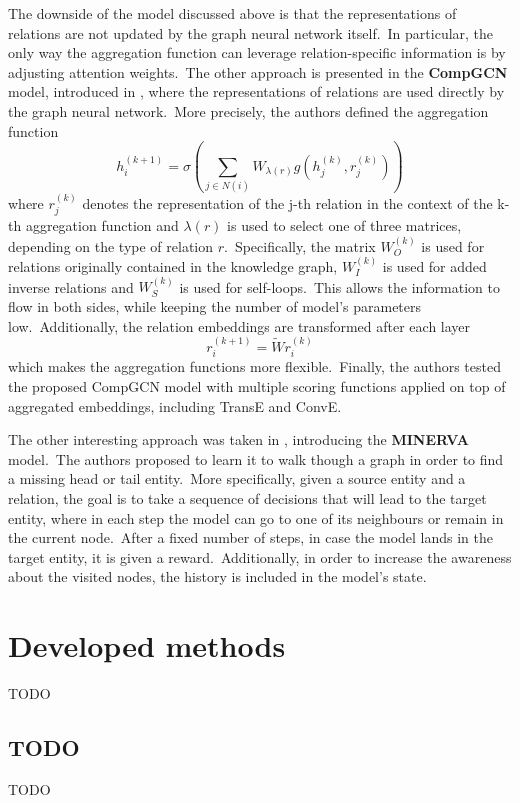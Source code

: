 \documentclass[longabstract, english, mgr]{iithesis}
\newcommand\numberedchapter[1]{\setlength\topskip{3cm}\chapter{#1}\setlength\topskip{0cm}}
\theoremstyle{default_theorem_style}\newtheorem{theorem}{Theorem}
\theoremstyle{default_theorem_style}\newtheorem{definition}{Definition}
\begin{document}
\noindent The downside of the model discussed above is that the representations of relations are not updated by the
graph neural network itself.\ In particular, the only way the aggregation function can leverage relation-specific
information is by adjusting attention weights.\ The other approach is presented in the \textbf{CompGCN} model,
introduced in \cite{comp_gcn_model}, where the representations of relations are used directly by the graph neural
network.\ More precisely, the authors defined the aggregation function
$$
h_i^{(k + 1)} = \sigma(\sum_{j \in N(i)} W_{\lambda(r)} g(h_j^{(k)}, r_j^{(k)}))
$$
where $r_j^{(k)}$ denotes the representation of the j-th relation in the context of the k-th aggregation function and
$\lambda(r)$ is used to select one of three matrices, depending on the type of relation $r$.\ Specifically, the
matrix $W_O^{(k)}$ is used for relations originally contained in the knowledge graph, $W_I^{(k)}$ is used for added
inverse relations and $W_S^{(k)}$ is used for self-loops.\ This allows the information to flow in both sides, while
keeping the number of model's parameters low.\ Additionally, the relation embeddings are transformed after each layer
$$
r_i^{(k + 1)} = \tilde{W} r_i^{(k)}
$$
which makes the aggregation functions more flexible.\ Finally, the authors tested the proposed CompGCN model with
multiple scoring functions applied on top of aggregated embeddings, including TransE and ConvE.\newline

\noindent The other interesting approach was taken in \cite{go_for_a_walk_model}, introducing the \textbf{MINERVA}
model.\ The authors proposed to learn it to walk though a graph in order to find a missing head or tail
entity.\ More specifically, given a source entity and a relation, the goal is to take a sequence of decisions that
will lead to the target entity, where in each step the model can go to one of its neighbours or remain in the current
node.\ After a fixed number of steps, in case the model lands in the target entity, it is given a reward.\ Additionally,
in order to increase the awareness about the visited nodes, the history is included in the model's state.


\numberedchapter{Developed methods}

TODO

\section{TODO}

TODO
\end{document}
